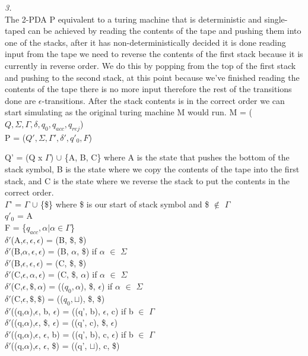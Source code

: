 \documentclass[12pt]{report}
\begin{document}
\textit{3.}\\
The 2-PDA P equivalent to a turing machine that is deterministic and single-taped can be achieved by reading the contents of the tape and pushing them into one of the stacks, after it has non-deterministically decided it is done reading input from the tape we need to reverse the contents of the first stack because it is  currently in reverse order.  We do this by popping from the  top of the first stack and pushing to the second stack, at this point because we've finished reading the contents of the tape there is no more input therefore the rest of the transitions done are $\epsilon$-transitions.  After the stack contents is in the correct order we can start simulating as the original turing machine  M would run.
M = ($Q, \Sigma, \Gamma, \delta, q_0, q_{acc}, q_{rej}$)
\\
P = ($Q', \Sigma, \Gamma', \delta', q'_0, F$)\\
\begin{addmargin}[1cm]{0em}
Q' = (Q x $\Gamma$) $\cup$ \{A, B, C\}  where A is the state that pushes the bottom of the stack symbol, B is the state where we copy the contents of the tape into the first stack, and C is the state where we reverse the stack to put the contents in the correct order.\\
$\Gamma$' = $\Gamma$ $\cup$ \{\$\} where \$ is our start of stack symbol and \$ $\notin$ $\Gamma$\\
$q'_0$ = A\\
F = \{$q_{acc}, \alpha \vert \alpha \in \Gamma$\}\\

$\delta'$(A,$\epsilon, \epsilon, \epsilon$) = (B, \$, \$)\\
$\delta'$(B,$\alpha, \epsilon, \epsilon$) = (B, $\alpha$, \$)				if $\alpha$ $\in$ $\Sigma$\\
$\delta'$(B,$\epsilon, \epsilon, \epsilon$) = (C, \$, \$)\\
$\delta'$(C,$\epsilon, \alpha, \epsilon$) = (C, \$, $\alpha$)				if $\alpha$ $\in$ $\Sigma$\\
$\delta'$(C,$\epsilon, \$, \alpha$) = (($q_0, \alpha$), \$, $\epsilon$)		if $\alpha$ $\in$ $\Sigma$\\
$\delta'$(C,$\epsilon, \$, \$$) = (($q_0, \sqcup$), \$, \$)\\
$\delta'$((q,$\alpha$),$\epsilon$, b, $\epsilon$) = ((q', b), $\epsilon$, c)	if b $\in$ $\Gamma$\\
$\delta'$((q,$\alpha$),$\epsilon$, \$, $\epsilon$) = ((q', c), \$, $\epsilon$)\\
$\delta'$((q,$\alpha$),$\epsilon$, $\epsilon$, b) = ((q', b), c, $\epsilon$)	if b $\in$ $\Gamma$\\
$\delta'$((q,$\alpha$),$\epsilon$, $\epsilon$, \$) = ((q', $\sqcup$), c, \$)\\

\end{addmargin}
\end{document}
